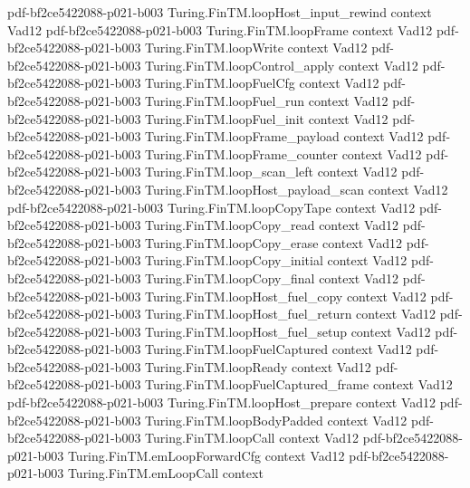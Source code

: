 \begin{theorem}
  {pdf-bf2ce5422088-p021-b003}
\proofstep
  {Turing.FinTM.loopHost_input_rewind}
  {context}
  {Vad12}
  {pdf-bf2ce5422088-p021-b003}
\proofstep
  {Turing.FinTM.loopFrame}
  {context}
  {Vad12}
  {pdf-bf2ce5422088-p021-b003}
\proofstep
  {Turing.FinTM.loopWrite}
  {context}
  {Vad12}
  {pdf-bf2ce5422088-p021-b003}
\proofstep
  {Turing.FinTM.loopControl_apply}
  {context}
  {Vad12}
  {pdf-bf2ce5422088-p021-b003}
\proofstep
  {Turing.FinTM.loopFuelCfg}
  {context}
  {Vad12}
  {pdf-bf2ce5422088-p021-b003}
\proofstep
  {Turing.FinTM.loopFuel_run}
  {context}
  {Vad12}
  {pdf-bf2ce5422088-p021-b003}
\proofstep
  {Turing.FinTM.loopFuel_init}
  {context}
  {Vad12}
  {pdf-bf2ce5422088-p021-b003}
\proofstep
  {Turing.FinTM.loopFrame_payload}
  {context}
  {Vad12}
  {pdf-bf2ce5422088-p021-b003}
\proofstep
  {Turing.FinTM.loopFrame_counter}
  {context}
  {Vad12}
  {pdf-bf2ce5422088-p021-b003}
\proofstep
  {Turing.FinTM.loop_scan_left}
  {context}
  {Vad12}
  {pdf-bf2ce5422088-p021-b003}
\proofstep
  {Turing.FinTM.loopHost_payload_scan}
  {context}
  {Vad12}
  {pdf-bf2ce5422088-p021-b003}
\proofstep
  {Turing.FinTM.loopCopyTape}
  {context}
  {Vad12}
  {pdf-bf2ce5422088-p021-b003}
\proofstep
  {Turing.FinTM.loopCopy_read}
  {context}
  {Vad12}
  {pdf-bf2ce5422088-p021-b003}
\proofstep
  {Turing.FinTM.loopCopy_erase}
  {context}
  {Vad12}
  {pdf-bf2ce5422088-p021-b003}
\proofstep
  {Turing.FinTM.loopCopy_initial}
  {context}
  {Vad12}
  {pdf-bf2ce5422088-p021-b003}
\proofstep
  {Turing.FinTM.loopCopy_final}
  {context}
  {Vad12}
  {pdf-bf2ce5422088-p021-b003}
\proofstep
  {Turing.FinTM.loopHost_fuel_copy}
  {context}
  {Vad12}
  {pdf-bf2ce5422088-p021-b003}
\proofstep
  {Turing.FinTM.loopHost_fuel_return}
  {context}
  {Vad12}
  {pdf-bf2ce5422088-p021-b003}
\proofstep
  {Turing.FinTM.loopHost_fuel_setup}
  {context}
  {Vad12}
  {pdf-bf2ce5422088-p021-b003}
\proofstep
  {Turing.FinTM.loopFuelCaptured}
  {context}
  {Vad12}
  {pdf-bf2ce5422088-p021-b003}
\proofstep
  {Turing.FinTM.loopReady}
  {context}
  {Vad12}
  {pdf-bf2ce5422088-p021-b003}
\proofstep
  {Turing.FinTM.loopFuelCaptured_frame}
  {context}
  {Vad12}
  {pdf-bf2ce5422088-p021-b003}
\proofstep
  {Turing.FinTM.loopHost_prepare}
  {context}
  {Vad12}
  {pdf-bf2ce5422088-p021-b003}
\proofstep
  {Turing.FinTM.loopBodyPadded}
  {context}
  {Vad12}
  {pdf-bf2ce5422088-p021-b003}
\proofstep
  {Turing.FinTM.loopCall}
  {context}
  {Vad12}
  {pdf-bf2ce5422088-p021-b003}
\proofstep
  {Turing.FinTM.emLoopForwardCfg}
  {context}
  {Vad12}
  {pdf-bf2ce5422088-p021-b003}
\proofstep
  {Turing.FinTM.emLoopCall}
  {context}

\end{theorem}
